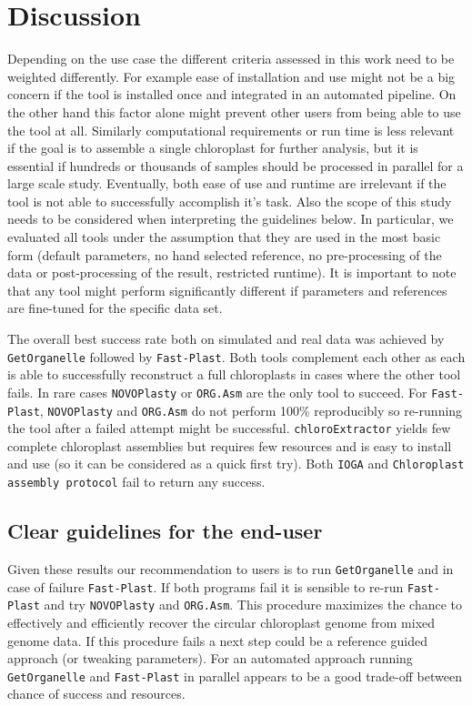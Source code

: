 \documentclass{bmcart}
\newcommand{\formatprogramnames}[1]{\texttt{#1}}
\newcommand{\ce}{\formatprogramnames{chloroExtractor}}
\newcommand{\oa}{\formatprogramnames{ORG.Asm}}
\newcommand{\fp}{\formatprogramnames{Fast-Plast}}
\newcommand{\ioga}{\formatprogramnames{IOGA}}
\newcommand{\np}{\formatprogramnames{NOVOPlasty}}
\newcommand{\go}{\formatprogramnames{GetOrganelle}}
\newcommand{\cassp}{\formatprogramnames{Chloroplast assembly protocol}}
\begin{document}
\section*{Discussion}
Depending on the use case the different criteria assessed in this work need to be weighted differently.
For example ease of installation and use might not be a big concern if the tool is installed once and integrated in an automated pipeline. On the other hand this factor alone might prevent other users from being able to use the tool at all.
Similarly computational requirements or run time is less relevant if the goal is to assemble a single chloroplast for further analysis, but it is essential if hundreds or thousands of samples should be processed in parallel for a large scale study.
Eventually, both ease of use and runtime are irrelevant if the tool is not able to successfully accomplish it's task.
Also the scope of this study needs to be considered when interpreting the guidelines below.
In particular, we evaluated all tools under the assumption that they are used in the most basic form (default parameters, no hand selected reference, no pre-processing of the data or post-processing of the result, restricted runtime).
It is important to note that any tool might perform significantly different if parameters and references are fine-tuned for the specific data set.

The overall best success rate both on simulated and real data was achieved by \go{} followed by \fp{}.
Both tools complement each other as each is able to successfully reconstruct a full chloroplasts in cases where the other tool fails.
In rare cases \np{} or \oa{} are the only tool to succeed.
For \fp{}, \np{} and \oa{} do not perform 100\% reproducibly so re-running the tool after a failed attempt might be successful.
\ce{} yields few complete chloroplast assemblies but requires few resources and is easy to install and use (so it can be considered as a quick first try).
Both \ioga{} and \cassp{} fail to return any success.

\subsection*{Clear guidelines for the end-user}
Given these results our recommendation to users is to run \go{} and in case of failure \fp{}.
If both programs fail it is sensible to re-run \fp{} and try \np{} and \oa{}.
This procedure maximizes the chance to effectively and efficiently recover the circular chloroplast genome from mixed genome data.
If this procedure fails a next step could be a reference guided approach (or tweaking parameters).
For an automated approach running \go{} and \fp{} in parallel appears to be a good trade-off between chance of success and resources.
\end{document}

